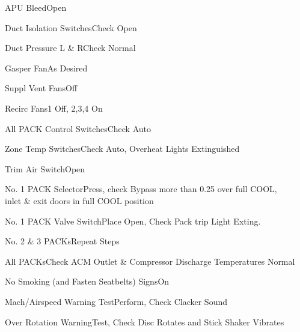 \documentclass[sim-use, blue_items]{checklist}
\begin{document}
\begin{continuedchecklist}
	 {
		\item{APU Bleed}{Open}
		\item{Duct Isolation Switches}{Check Open}
		\item{Duct Pressure L \& R}{Check Normal}
		\item{Gasper Fan}{As Desired}
		\item{Suppl Vent Fans}{Off}
		\item{Recirc Fans}{1 Off, 2,3,4 On}
		\item{All PACK Control Switches}{Check Auto}
		\item{Zone Temp Switches}{Check Auto, Overheat Lights Extinguished}
		\item{Trim Air Switch}{Open}
		\item{No. 1 PACK Selector}{Press, check Bypass more than 0.25 over full COOL,\\inlet \& exit doors in full COOL position}
		\item{No. 1 PACK Valve Switch}{Place Open, Check Pack trip Light Exting.}
		\item{No. 2 \& 3 PACKs}{Repeat Steps}
		\item{All PACKs}{Check ACM Outlet \& Compressor Discharge Temperatures Normal}
	}
	\item{No Smoking (and Fasten Seatbelts) Signs}{On}
	\item{Mach/Airspeed Warning Test}{Perform, Check Clacker Sound}
	 {
		\item{Over Rotation Warning}{Test, Check Disc Rotates and Stick Shaker Vibrates}
	}
\end{continuedchecklist}
\end{document}
